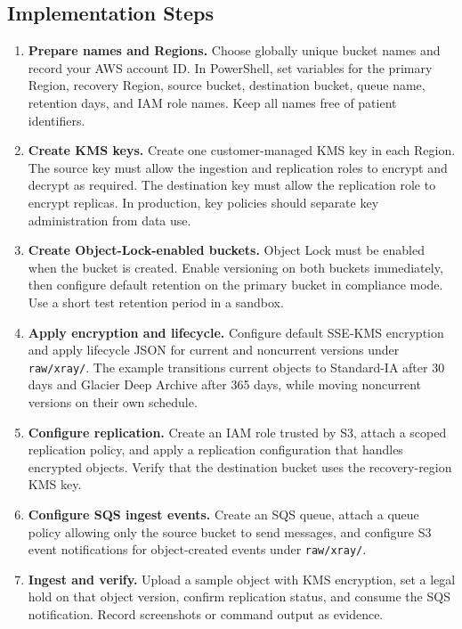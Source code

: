 \subsection*{Implementation Steps}
\begin{enumerate}
    \item \textbf{Prepare names and Regions.} Choose globally unique bucket names and record your AWS account ID. In PowerShell, set variables for the primary Region, recovery Region, source bucket, destination bucket, queue name, retention days, and IAM role names. Keep all names free of patient identifiers.
    \item \textbf{Create KMS keys.} Create one customer-managed KMS key in each Region. The source key must allow the ingestion and replication roles to encrypt and decrypt as required. The destination key must allow the replication role to encrypt replicas. In production, key policies should separate key administration from data use.
    \item \textbf{Create Object-Lock-enabled buckets.} Object Lock must be enabled when the bucket is created. Enable versioning on both buckets immediately, then configure default retention on the primary bucket in compliance mode. Use a short test retention period in a sandbox.
    \item \textbf{Apply encryption and lifecycle.} Configure default SSE-KMS encryption and apply lifecycle JSON for current and noncurrent versions under \texttt{raw/xray/}. The example transitions current objects to Standard-IA after 30 days and Glacier Deep Archive after 365 days, while moving noncurrent versions on their own schedule.
    \item \textbf{Configure replication.} Create an IAM role trusted by S3, attach a scoped replication policy, and apply a replication configuration that handles encrypted objects. Verify that the destination bucket uses the recovery-region KMS key.
    \item \textbf{Configure SQS ingest events.} Create an SQS queue, attach a queue policy allowing only the source bucket to send messages, and configure S3 event notifications for object-created events under \texttt{raw/xray/}.
    \item \textbf{Ingest and verify.} Upload a sample object with KMS encryption, set a legal hold on that object version, confirm replication status, and consume the SQS notification. Record screenshots or command output as evidence.
\end{enumerate}


